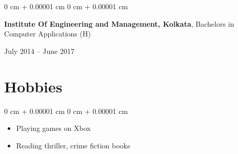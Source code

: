\documentclass[10pt, letterpaper]{article}
\newenvironment{highlights}{
    \begin{itemize}[
        topsep=0.10 cm,
        parsep=0.10 cm,
        partopsep=0pt,
        itemsep=0pt,
        leftmargin=0 cm + 10pt
    ]
}{
    \end{itemize}
} %
\newenvironment{onecolentry}{
    \begin{adjustwidth}{
        0 cm + 0.00001 cm
    }{
        0 cm + 0.00001 cm
    }
}{
    \end{adjustwidth}
} %
\newenvironment{twocolentry}[2][]{
    \onecolentry
    \def\secondColumn{#2}
    \setcolumnwidth{\fill, 4.5 cm}
    \begin{paracol}{2}
}{
    \switchcolumn \raggedleft \secondColumn
    \end{paracol}
    \endonecolentry
} %
\begin{document}
        \vspace{0.10 cm}
        
        \begin{twocolentry}{
            July 2014 – June 2017
        }
            \textbf{Institute Of Engineering and Management, Kolkata},  Bachelors in Computer Applications (H)
        \end{twocolentry}

    \section{Hobbies}

        \begin{onecolentry}
            \begin{highlights}
                \item Playing games on Xbox
                \item Reading thriller, crime fiction books
            \end{highlights}
        \end{onecolentry}
\end{document}
